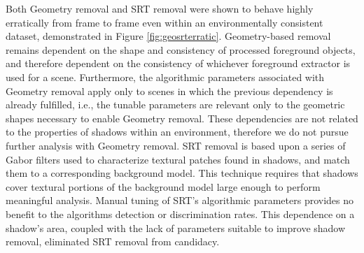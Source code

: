 
Both Geometry removal and SRT removal were shown to behave highly erratically from frame to frame even within an environmentally consistent dataset, demonstrated in Figure \ref{fig:geosrterratic}. Geometry-based removal remains dependent on the shape and consistency of processed foreground objects, and therefore dependent on the consistency of whichever foreground extractor is used for a scene. Furthermore, the algorithmic parameters associated with Geometry removal apply only to scenes in which the previous dependency is already fulfilled, i.e., the tunable parameters are relevant only to the geometric shapes necessary to enable Geometry removal. These dependencies are not related to the properties of shadows within an environment, therefore we do not pursue further analysis with Geometry removal. SRT removal is based upon a series of Gabor filters used to characterize textural patches found in shadows, and match them to a corresponding background model. This technique requires that shadows cover textural portions of the background model large enough to perform meaningful analysis. Manual tuning of SRT's algorithmic parameters provides no benefit to the algorithms detection or discrimination rates. This dependence on a shadow's area, coupled with the lack of parameters suitable to improve shadow removal, eliminated SRT removal from candidacy. 

